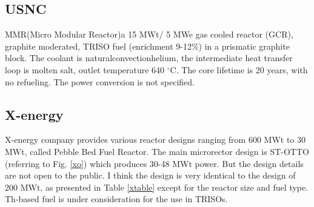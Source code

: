 \subsection{USNC}
MMR(Micro Modular Reactor)a 15 MWt/ 5 MWe gas cooled reactor (GCR),  graphite  moderated,  TRISO  fuel  (enrichment 9-12\%)  in  a  prismatic  graphite  block. The  coolant  is naturalconvectionhelium, the intermediate heat transfer loop is molten salt, outlet temperature 640 $^\circ{}$C. The core lifetime is 20 years, with no refueling. The power conversion is not specified.

\pagebreak
\subsection{X-energy}
X-energy company provides various reactor designs ranging from 600 MWt to 30 MWt, called Pebble Bed Fuel Reactor. The main microrector design is ST-OTTO (referring to Fig.  \ref{xo}) which produces 30-48 MWt power. But the design details are not open to the public. I think the design is very identical to the design of 200 MWt, as presented in Table \ref{xtable} except for the reactor size and fuel type. Th-based fuel is under consideration for the use in TRISOs. 

